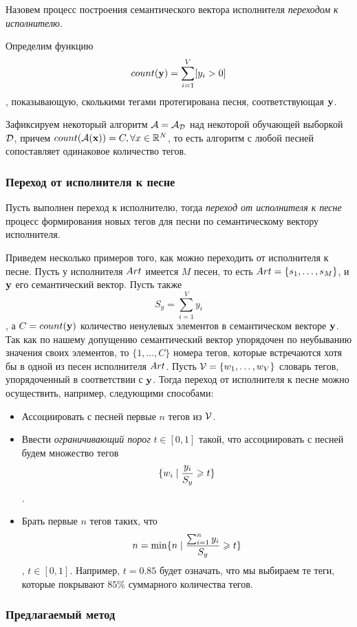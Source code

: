 Назовем процесс построения семантического вектора исполнителя \emph{переходом к исполнителю}.

Определим функцию $$count(\mathbf{y}) = \sum^{V}_{i=1} [y_i > 0]$$,
показывающую, сколькими тегами протегирована песня, соответствующая $\mathbf{y}$.

Зафиксируем некоторый алгоритм $\mathcal{A} = \mathcal{A}_{\mathcal{D}}$ над некоторой обучающей выборкой $\mathcal{D}$, причем $count(\mathcal{A}(\mathbf{x})) = C, \forall x \in \mathbb{R}^N$,
то есть алгоритм с любой песней сопоставляет одинаковое количество тегов.

\subsubsection{Переход от исполнителя к песне}

Пусть выполнен переход к исполнителю, тогда \emph{переход от исполнителя к песне} \ld процесс формирования новых тегов для песни по семантическому вектору исполнителя.

Приведем несколько примеров того, как можно переходить от исполнителя к песне. Пусть у исполнителя ${Art}$ имеется $M$ песен, то есть ${Art} = \{ s_1, \ldots, s_M \}$, 
и $\mathbf{y}$ \ld его семантический вектор. Пусть также $$S_y = \sum_{i=1}^{V} y_i$$, а $C = count(\mathbf{y})$ \ld количество ненулевых элементов в семантическом векторе $\mathbf{y}$.
Так как по нашему допущению семантический вектор упорядочен по неубыванию значения своих элементов, то $\{ 1, \ldots, C \}$ \ld номера тегов, которые встречаются хотя бы в одной 
из песен исполнителя ${Art}$. Пусть $\mathcal{V} = \{w_1, \ldots, w_V \}$ \ld словарь тегов, упорядоченный в соответствии с $\mathbf{y}$. 
Тогда переход от исполнителя к песне можно осуществить, например, следующими способами:
\begin{itemize}
 \item Ассоциировать с песней первые $n$ тегов из $\mathcal{V}$.
 \item Ввести \emph{ограничивающий порог} $t \in [0, 1]$ такой, что ассоциировать с песней будем множество тегов 
 $$ \{ w_i \mid \frac{y_i}{S_y} \geqslant t \} $$.
 \item Брать первые $n$ тегов таких, что $$n = \min \{ n \mid \frac{\sum_{i=1}^{n} y_i}{S_y} \geqslant t \}$$, $t \in [0, 1]$. Например, $t = 0.85$ будет означать, 
 что мы выбираем те теги, которые покрывают $85\%$ суммарного количества тегов.
\end{itemize}

\subsubsection{Предлагаемый метод}

